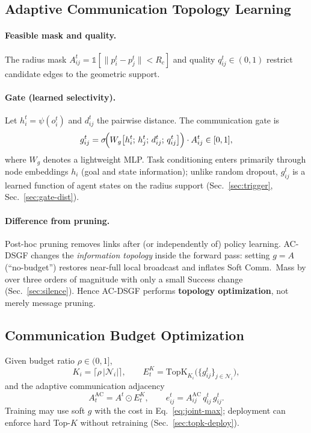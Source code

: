 \subsection{Adaptive Communication Topology Learning}
\label{sec:ac-graph}

\paragraph{Feasible mask and quality.}
The radius mask $A_{ij}^{t}=\mathbb{1}[\|p_i^{t}-p_j^{t}\|<R_c]$ and quality
$q_{ij}^{t}\in(0,1)$ restrict candidate edges to the geometric support.

\paragraph{Gate (learned selectivity).}
Let $h_i^{t}=\psi(o_i^{t})$ and $d_{ij}^{t}$ the pairwise distance.
The communication gate is
\begin{equation}
g_{ij}^{t}
=
\sigma\!\Bigl(
W_g
\bigl[
h_i^{t};\,
h_j^{t};\,
d_{ij}^{t};\,
q_{ij}^{t}
\bigr]
\Bigr)
\cdot
A_{ij}^{t}
\in[0,1],
\label{eq:gate}
\end{equation}
where $W_g$ denotes a lightweight MLP.
Task conditioning enters primarily through node embeddings $h_i$ (goal and
state information); unlike random dropout, $g_{ij}^{t}$ is a learned function
of agent states on the radius support
(Sec.~\ref{sec:trigger}, Sec.~\ref{sec:gate-dist}).

\paragraph{Difference from pruning.}
Post-hoc pruning removes links after (or independently of) policy learning.
AC-DSGF changes the \emph{information topology} inside the forward pass:
setting $g{=}A$ (``no-budget'') restores near-full local broadcast and
inflates Soft Comm.\ Mass by over three orders of magnitude with only a small
Success change (Sec.~\ref{sec:silence}).
Hence AC-DSGF performs \textbf{topology optimization}, not merely message
pruning.

\subsection{Communication Budget Optimization}
\label{sec:budget}

Given budget ratio $\rho\in(0,1]$,
\begin{equation}
K_i=\lceil\rho\,|\mathcal{N}_i|\rceil,
\qquad
E_t^{K}
=
\mathrm{TopK}_{K_i}\!\bigl(\{g_{ij}^{t}\}_{j\in\mathcal{N}_i}\bigr),
\label{eq:topk}
\end{equation}
and the adaptive communication adjacency
\begin{equation}
A_t^{\mathrm{AC}}
=
A^{t}
\odot
E_t^{K},
\qquad
e_{ij}^{t}
=
A_{ij}^{\mathrm{AC}}\,
q_{ij}^{t}\,
g_{ij}^{t}.
\label{eq:Aac}
\end{equation}
Training may use soft $g$ with the cost in Eq.~\eqref{eq:joint-max};
deployment can enforce hard Top-$K$ without retraining
(Sec.~\ref{sec:topk-deploy}).

